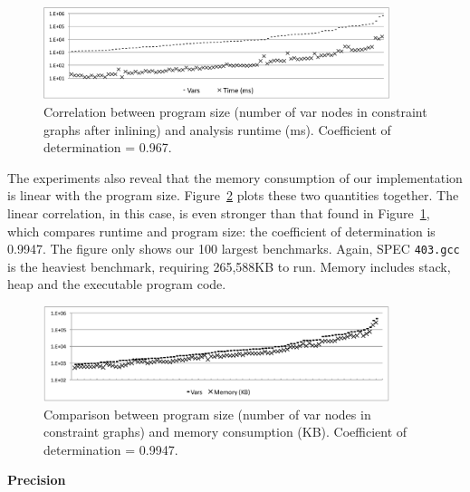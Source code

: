 \documentclass{paper}
\begin{document}
\begin{figure}[t!]
\begin{center}
\includegraphics[width=0.9\textwidth]{images/TimeCorr}
\end{center}
\caption{\label{fig:TimeCorr}
Correlation between program size (number of var nodes in constraint
graphs after inlining) and analysis runtime (ms).
Coefficient of determination = 0.967.
}
\end{figure}

The experiments also reveal that the memory consumption of our implementation
is linear with the program size.
Figure~\ref{fig:MemCorr} plots these two quantities together.
The linear correlation, in this case, is even stronger than that found in
Figure~\ref{fig:TimeCorr}, which compares runtime and program size: the
coefficient of determination is 0.9947.
The figure only shows our 100 largest benchmarks.
Again, SPEC \texttt{403.gcc} is the heaviest benchmark, requiring
265,588KB to run.
Memory includes stack, heap and the executable program code.

\begin{figure}[t!]
\begin{center}
\includegraphics[width=0.9\textwidth]{images/MemCorr}
\end{center}
\caption{\label{fig:MemCorr}
Comparison between program size (number of var nodes in constraint
graphs) and memory consumption (KB).
Coefficient of determination = 0.9947.
}
\end{figure}

\noindent
\textbf{Precision}
\end{document}
